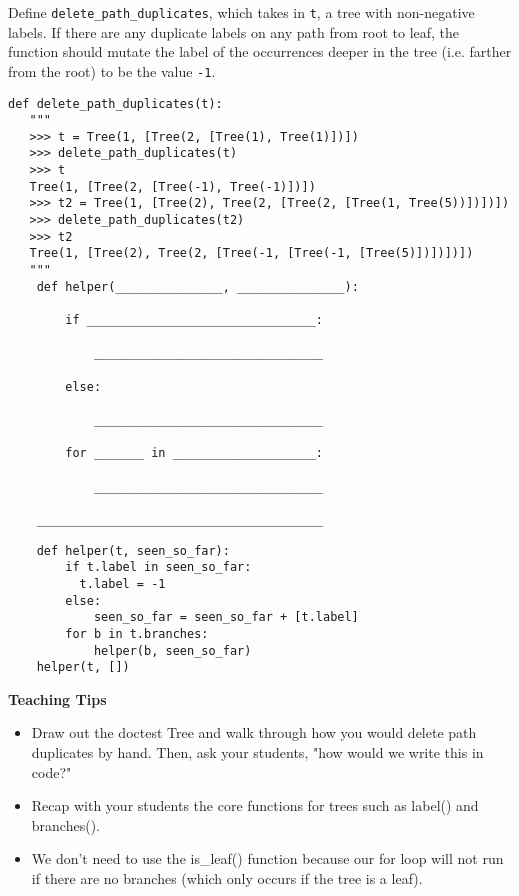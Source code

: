 
\question
Define \texttt{delete\_path\_duplicates}, which takes in \texttt{t}, a tree
with non-negative labels. If there are any duplicate labels on any path
from root to leaf, the function should mutate the label of the occurrences
deeper in the tree (i.e. farther from the root) to be the value \texttt{-1}.

\begin{lstlisting}
def delete_path_duplicates(t):
   """
   >>> t = Tree(1, [Tree(2, [Tree(1), Tree(1)])])
   >>> delete_path_duplicates(t)
   >>> t
   Tree(1, [Tree(2, [Tree(-1), Tree(-1)])])
   >>> t2 = Tree(1, [Tree(2), Tree(2, [Tree(2, [Tree(1, Tree(5))])])])
   >>> delete_path_duplicates(t2)
   >>> t2
   Tree(1, [Tree(2), Tree(2, [Tree(-1, [Tree(-1, [Tree(5)])])])])
   """
    def helper(_______________, _______________):

        if ________________________________:

            ________________________________

        else:

            ________________________________

        for _______ in ____________________:

            ________________________________

    ________________________________________

\end{lstlisting}

\begin{blocksection}
\begin{solution}
\begin{lstlisting}
    def helper(t, seen_so_far):
        if t.label in seen_so_far:
          t.label = -1
        else:
            seen_so_far = seen_so_far + [t.label]
        for b in t.branches:
            helper(b, seen_so_far)
    helper(t, [])
\end{lstlisting}
\end{solution}
\end{blocksection}

\begin{guide}
    \textbf{Teaching Tips}
    \begin{itemize}
       \item Draw out the doctest Tree and walk through how you would delete path duplicates by hand. Then, ask your students, "how would we write this in code?"
       \item Recap with your students the core functions for trees such as label() and branches().
       \item We don't need to use the is\_leaf() function because our for loop will not run if there are no branches (which only occurs if the tree is a leaf).
    \end{itemize}
 \end{guide}

